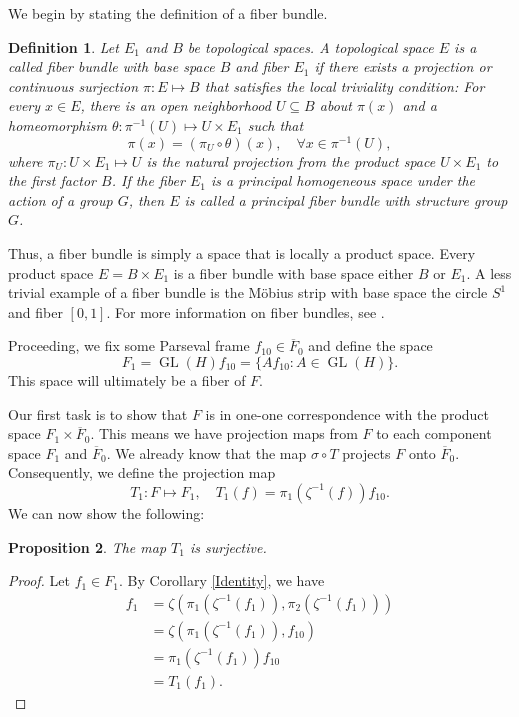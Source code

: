 \documentclass{article}
\newtheorem{defn}{Definition}
\newtheorem{prop}[defn]{Proposition}
\newcommand{\GL}{\operatorname{GL}}
\newcommand{\Fbar}{\overline{F}}
\begin{document}
We begin by stating the definition of a fiber bundle.

\begin{defn}
Let $E_1$ and $B$ be topological spaces. A topological space $E$ is a called \emph{fiber bundle} with base space $B$ and fiber $E_1$ if there exists a \emph{projection} or continuous surjection $\pi:E\mapsto B$ that satisfies the \emph{local triviality condition}: For every $x\in E$, there is an open neighborhood $U\subseteq B$ about $\pi(x)$ and a homeomorphism $\theta:\pi^{-1}(U)\mapsto U\times E_1$ such that
\[ \pi(x) = (\pi_U\circ\theta)(x), \quad\forall x\in \pi^{-1}(U), \]
where $\pi_U:U\times E_1\mapsto U$ is the natural projection from the product space $U\times E_1$ to the first factor $B$. If the fiber $E_1$ is a principal homogeneous space under the action of a group $G$, then $E$ is called a \emph{principal fiber bundle} with \emph{structure group} $G$.
\end{defn}

Thus, a fiber bundle is simply a space that is locally a product space. Every product space $E = B\times E_1$ is a fiber bundle with base space either $B$ or $E_1$. A less trivial example of a fiber bundle is the M\"{o}bius strip with base space the circle $S^1$ and fiber $[0, 1]$. For more information on fiber bundles, see \cite{steenrod1951topology}.

Proceeding, we fix some Parseval frame $f_{10}\in\Fbar_0$ and define the space
\begin{equation} \label{F1}
F_1 = \GL(H)f_{10}
= \{Af_{10}: A\in \GL(H)\}.
\end{equation}
This space will ultimately be a fiber of $F$.

Our first task is to show that $F$ is in one-one correspondence with the product space $F_1\times\Fbar_0$. This means we have projection maps from $F$ to each component space $F_1$ and $\Fbar_0$. We already know that the map $\sigma\circ T$ projects $F$ onto $\Fbar_0$. Consequently, we define the projection map
\begin{equation} \label{T1}
T_1:F\mapsto F_1, \quad
T_1(f) = \pi_1(\zeta^{-1}(f))f_{10}.
\end{equation}
We can now show the following:
\begin{prop} \label{T1Surjection}
The map $T_1$ is surjective.
\end{prop}
\begin{proof}
Let $f_1\in F_1$. By Corollary \ref{Identity}, we have
\begin{align*}
f_1 &= \zeta(\pi_1(\zeta^{-1}(f_1)), \pi_2(\zeta^{-1}(f_1))) \\
&= \zeta(\pi_1(\zeta^{-1}(f_1)), f_{10}) \\
&= \pi_1(\zeta^{-1}(f_1)) f_{10} \\
&= T_1(f_1).
\end{align*}
\end{proof}
\end{document}
